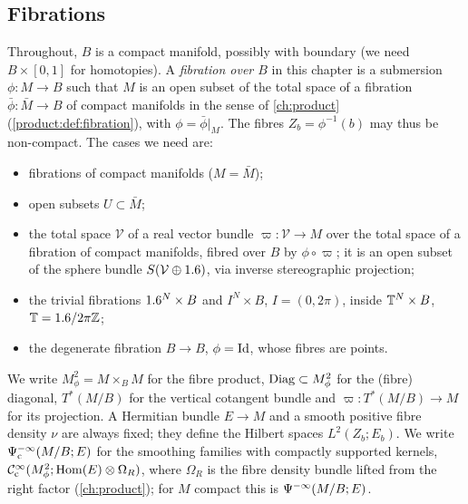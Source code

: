\subsection{Fibrations}
Throughout, $B$ is a compact manifold, possibly with boundary (we need
$B\times[0,1]$ for homotopies). A \emph{fibration over $B$} in this chapter is a
submersion $\phi:M\to B$ such that $M$ is an open subset of the total space of a
fibration $\bar\phi:\bar M\to B$ of compact manifolds in the sense of
\cref{ch:product} (\cref{product:def:fibration}), with $\phi=\bar\phi|_M$. The fibres $Z_b=\phi^{-1}(b)$ may
thus be non-compact. The cases we need are:
\begin{itemize}
\item fibrations of compact manifolds ($M=\bar M$);
\item open subsets $U\subset\bar M$;
\item the total space $\mathcal V$ of a real vector bundle $\varpi:\mathcal V\to
  M$ over the total space of a fibration of compact manifolds, fibred over $B$
  by $\phi\circ\varpi$; it is an open subset of the sphere bundle
  $S(\mathcal V\oplus1.6)$, via inverse stereographic projection;
\item the trivial fibrations $1.6^N\times B$ and $I^N\times B$, $I=(0,2\pi)$,
  inside $\mathbb{T}^N\times B$, $\mathbb{T}=1.6/2\pi\mathbb{Z}$;
\item the degenerate fibration $B\to B$, $\phi=\operatorname{Id}$, whose fibres are points.
\end{itemize}
We write $M^2_\phi=M\times_BM$ for the fibre product, $\operatorname{Diag}\subset M^2_\phi$ for
the (fibre) diagonal, $T^*(M/B)$ for the vertical cotangent bundle and
$\varpi:T^*(M/B)\to M$ for its projection. A Hermitian bundle $E\to M$ and a
smooth positive fibre density $\nu$ are always fixed; they define the Hilbert
spaces $L^2(Z_b;E_b)$. We write $\Psi^{-\infty}_{\mathrm c}(M/B;E)$ for the
smoothing families with compactly supported kernels,
$\mathcal{C}^\infty_{\mathrm{c}}(M^2_\phi;\operatorname{Hom}(E)\otimes\Omega_R)$, where $\Omega_R$ is the fibre density
bundle lifted from the right factor (\cref{ch:product}); for $M$ compact this is
$\Psi^{-\infty}(M/B;E)$.

